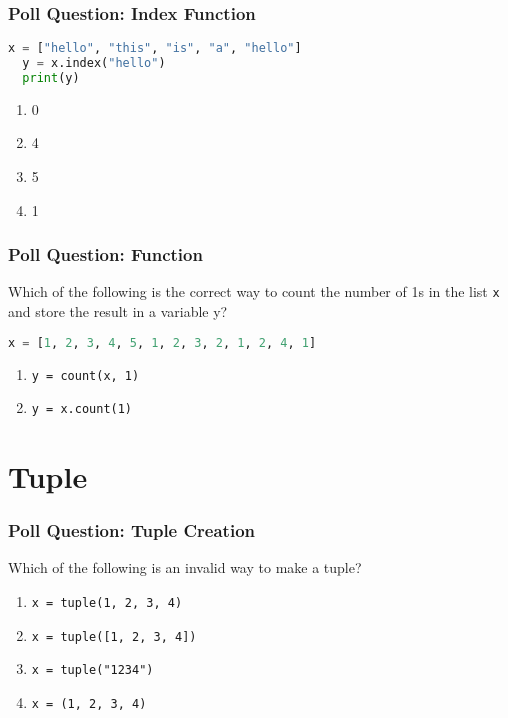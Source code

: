 \documentclass[xcolor=table]{beamer}
\begin{document}
%
%
\begin{frame}[fragile]
  \frametitle{Poll Question: Index Function} 
  \begin{lstlisting}[language=Python, autogobble]
  x = ["hello", "this", "is", "a", "hello"]
  y = x.index("hello")
  print(y)
  \end{lstlisting}
  \vfill
  \begin{enumerate}[A] 
    \item 0
    \item 4
    \item 5
    \item 1
  \end{enumerate}
\end{frame}

%
%
\begin{frame}[fragile]
  \frametitle{Poll Question: Function} 
  Which of the following is the correct way to count the number of 1s in the list \lstinline|x| and store the result in a variable y?
  \begin{lstlisting}[language=Python, autogobble]
  x = [1, 2, 3, 4, 5, 1, 2, 3, 2, 1, 2, 4, 1]
  \end{lstlisting}
  \vfill
  \begin{enumerate}[A] 
    \item \lstinline|y = count(x, 1)|
    \item \lstinline|y = x.count(1)|
  \end{enumerate}
\end{frame}


\section{Tuple}

%
%
\begin{frame}[fragile]
  \frametitle{Poll Question: Tuple Creation}
  Which of the following is an invalid way to make a tuple? 
  \vfill
  \begin{enumerate}[A] 
    \item \lstinline|x = tuple(1, 2, 3, 4)|
    \item \lstinline|x = tuple([1, 2, 3, 4])|
    \item \lstinline|x = tuple("1234")|
    \item \lstinline|x = (1, 2, 3, 4)|
  \end{enumerate}
\end{frame}
\end{document}
